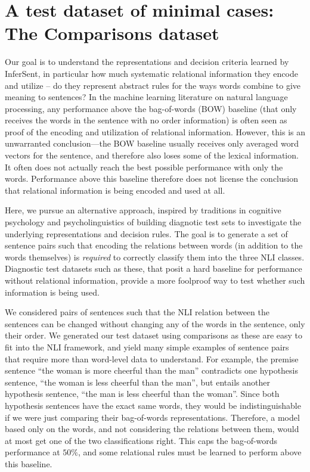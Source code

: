 \section{A test dataset of minimal cases: The Comparisons dataset}
Our goal is to understand the representations and decision criteria learned by InferSent, in particular how much systematic relational information they encode and utilize -- do they represent abstract rules for the ways words combine to give meaning to sentences? In the machine learning literature on natural language processing, any performance above the bag-of-words (BOW) baseline (that only receives the words in the sentence with no order information) is often seen as proof of the encoding and utilization of relational information. However, this is an unwarranted conclusion---the BOW baseline usually receives only averaged word vectors for the sentence, and therefore also loses some of the lexical information. It often does not actually reach the best possible performance with only the words. Performance above this baseline therefore does not license the conclusion that relational information is being encoded and used at all.

Here, we pursue an alternative approach, inspired by traditions in cognitive psychology and psycholinguistics of building diagnotic test sets to investigate the underlying representations and decision rules. The goal is to generate a set of sentence pairs such that encoding the relations between words (in addition to the words themselves) is \textit{required} to correctly classify them into the three NLI classes. Diagnostic test datasets such as these, that posit a hard baseline for performance without relational information, provide a more foolproof way to test whether such information is being used.

We considered pairs of sentences such that the NLI relation between the sentences can be changed without changing any of the words in the sentence, only their order. We generated our test dataset using comparisons as these are easy to fit into the NLI framework, and yield many simple examples of sentence pairs that require more than word-level data to understand. For example, the premise sentence ``the woman is more cheerful than the man'' contradicts one hypothesis sentence, ``the woman is less cheerful than the man'', but entails another hypothesis sentence, ``the man is less cheerful than the woman''. Since both hypothesis sentences have the exact same words, they would be indistinguishable if we were just comparing their bag-of-words representations. Therefore, a model based only on the words, and not considering the relations between them, would at most get one of the two classifications right. This caps the bag-of-words performance at $50\%$, and some relational rules must be learned to perform above this baseline. 

